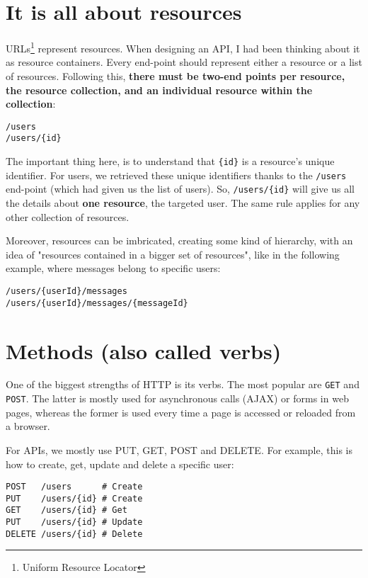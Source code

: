 \section{It is all about resources}

URLs\footnote{Uniform Resource Locator} represent resources. When designing an API, I had been thinking about it as resource containers. Every end-point should represent either a resource or a list of resources. Following this, \textbf{there must be two-end points per resource, the resource collection, and an individual resource within the collection}:

\begin{lstlisting}
/users
/users/{id}
\end{lstlisting}

The important thing here, is to understand that \lstinline|{id}| is a resource's unique identifier. For users, we retrieved these unique identifiers thanks to the \lstinline{/users} end-point (which had given us the list of users). So, \lstinline|/users/{id}| will give us all the details about \textbf{one resource}, the targeted user. The same rule applies for any other collection of resources.

\medskip

Moreover, resources can be imbricated, creating some kind of hierarchy, with an idea of "resources contained in a bigger set of resources", like in the following example, where messages belong to specific users:

\begin{lstlisting}
/users/{userId}/messages
/users/{userId}/messages/{messageId}
\end{lstlisting}

\section{Methods (also called verbs)}

One of the biggest strengths of HTTP is its verbs. The most popular are \lstinline{GET} and \lstinline{POST}. The latter is mostly used for asynchronous calls (AJAX) or forms in web pages, whereas the former is used every time a page is accessed or reloaded from a browser.

\medskip

For APIs, we mostly use PUT, GET, POST and DELETE. For example, this is how to create, get, update and delete a specific user:

\fakeshell
\begin{lstlisting}
POST   /users      # Create
PUT    /users/{id} # Create
GET    /users/{id} # Get
PUT    /users/{id} # Update
DELETE /users/{id} # Delete
\end{lstlisting}


